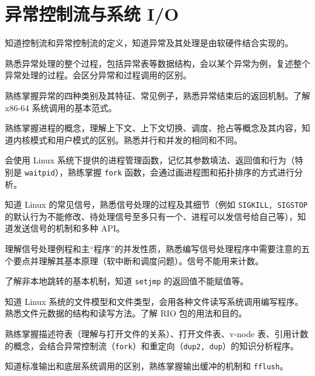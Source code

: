 \chapter{异常控制流与系统 I/O}\thispagestyle{empty}
    \begin{summary}
        \begin{compactitem}
            \item 知道控制流和异常控制流的定义，知道异常及其处理是由软硬件结合实现的。
            \item 熟悉异常处理的整个过程，包括异常表等数据结构，会以某个异常为例，复述整个异常处理的过程。会区分异常和过程调用的区别。
            \item 熟练掌握异常的四种类别及其特征、常见例子，熟悉异常结束后的返回机制。了解 x86-64 系统调用的基本范式。
            \item 熟练掌握进程的概念，理解上下文、上下文切换、调度、抢占等概念及其内容，知道内核模式和用户模式的区别。熟悉并行和并发的相同和不同。
            \item 会使用 Linux 系统下提供的进程管理函数，记忆其参数填法、返回值和行为（特别是 \verb|waitpid|），熟练掌握 \verb|fork| 函数，会通过画进程图和拓扑排序的方式进行分析。
            \item 知道 Linux 的常见信号，熟悉信号处理的过程及其细节（例如 \verb|SIGKILL, SIGSTOP| 的默认行为不能修改、待处理信号至多只有一个、进程可以发信号给自己等），知道发送信号的机制和多种 API。
            \item 理解信号处理例程和主“程序”的并发性质，熟悉编写信号处理程序中需要注意的五个要点并理解其基本原理（软中断和调度问题）。信号不能用来计数。
            \item 了解非本地跳转的基本机制，知道 \verb|setjmp| 的返回值不能赋值等。
            \item 知道 Linux 系统的文件模型和文件类型，会用各种文件读写系统调用编写程序。熟悉文件元数据的结构和读写方法。了解 RIO 包的用法和目的。
            \item 熟练掌握描述符表（理解与打开文件的关系）、打开文件表、v-node 表、引用计数的概念，会结合异常控制流（\verb|fork|）和重定向（\verb|dup2, dup|）的知识分析程序。
            \item 知道标准输出和底层系统调用的区别，熟练掌握输出缓冲的机制和 \verb|fflush|。
        \end{compactitem}
    \end{summary}

